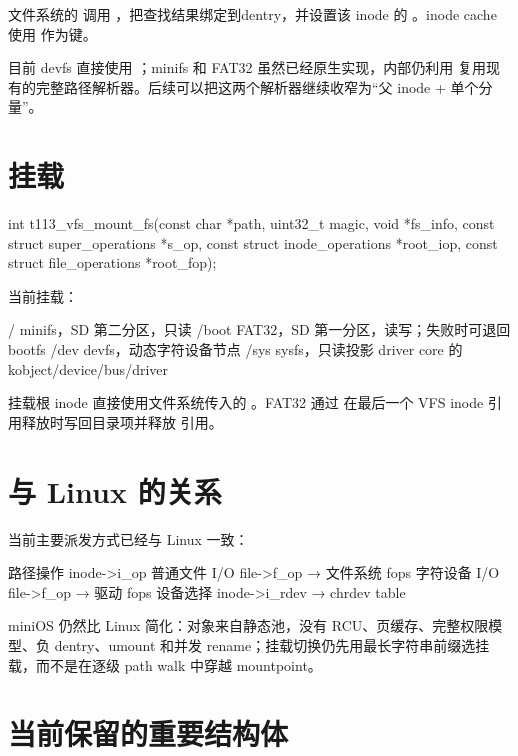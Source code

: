 文件系统的  调用 ，把查找结果绑定到dentry，并设置该 inode 的 。inode cache 使用 作为键。

目前 devfs 直接使用 ；minifs 和 FAT32 虽然已经原生实现，内部仍利用  复用现有的完整路径解析器。后续可以把这两个解析器继续收窄为“父 inode + 单个分量”。

\section{挂载}

\begin{ccode}
int t113_vfs_mount_fs(const char *path,
                      uint32_t magic,
                      void *fs_info,
                      const struct super_operations *s_op,
                      const struct inode_operations *root_iop,
                      const struct file_operations *root_fop);
\end{ccode}

当前挂载：

\begin{txtcode}
/       minifs，SD 第二分区，只读
/boot   FAT32，SD 第一分区，读写；失败时可退回 bootfs
/dev    devfs，动态字符设备节点
/sys    sysfs，只读投影 driver core 的 kobject/device/bus/driver
\end{txtcode}

挂载根 inode 直接使用文件系统传入的 。FAT32 通过 在最后一个 VFS inode 引用释放时写回目录项并释放  引用。

\section{与 Linux 的关系}

当前主要派发方式已经与 Linux 一致：

\begin{txtcode}
路径操作       inode->i_op
普通文件 I/O   file->f_op → 文件系统 fops
字符设备 I/O   file->f_op → 驱动 fops
设备选择       inode->i_rdev → chrdev table
\end{txtcode}

miniOS 仍然比 Linux 简化：对象来自静态池，没有 RCU、页缓存、完整权限模型、负 dentry、umount 和并发 rename；挂载切换仍先用最长字符串前缀选挂载，而不是在逐级 path walk 中穿越 mountpoint。

\section{ 当前保留的重要结构体}

